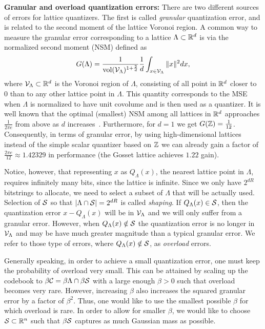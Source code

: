 \textbf{Granular and overload quantization errors:} There are two different sources of errors for lattice quantizers. The first is called \emph{granular} quantization error, and is related to the second moment of the lattice Voronoi region. A common way to measure the granular error corresponding to a lattice $\Lambda\subset\mathbb{R}^d$ is via the normalized second moment (NSM) defined as
\begin{align}
G(\Lambda)=\frac{1}{\mathrm{vol}(\mathcal{V}_{\Lambda})^{1+\frac{2}{d}}}\frac{1}{d}\int_{x\in \mathcal{V}_{\Lambda}}\|x\|^2dx,
\end{align}
where $\mathcal{V}_{\Lambda}\subset\mathbb{R}^d$ is the Voronoi region of $\Lambda$, consisting of all point in $\mathbb{R}^d$ closer to $0$ than to any other lattice point in $\Lambda$.
This quantity corresponds to the MSE when $\Lambda$ is normalized to have unit covolume and is then used as a quantizer. It is well known that the optimal (smallest) NSM among all lattices in $\mathbb{R}^d$ approaches $\frac{1}{2\pi e}$ from above as $d$ increases~\cite{ramiBook}. Furthermore, for $d=1$ we get $G(\mathbb{Z})=\frac{1}{12}$. Consequently, in terms of granular error, by using high-dimensional lattices instead of the simple scalar quantizer based on $\mathbb{Z}$ we can already gain a factor of $\frac{2\pi e}{12}\approx 1.42329$ in performance (the Gosset lattice achieves $1.22$ gain).

Notice, however, that representing $x$ as $Q_{\Lambda}(x)$, the nearest lattice point in $\Lambda$, requires infinitely many bits, since the lattice is infinite. Since we only have $2^{dR}$ bitstrings to allocate, we need to select a subset of $\Lambda$ that will be actually used. Selection of $\mathcal{S}$ so that $|\Lambda\cap \mathcal{S}|=2^{dR}$ is called \emph{shaping}. 
If $Q_{\Lambda}(x)\in\mathcal{S}$, then the quantization error $x-Q_{\Lambda}(x)$ will be in $\mathcal{V}_{\Lambda}$ and we will only suffer from a granular error. However, when $Q_{\Lambda}(x)\notin \mathcal{S}$ the quantization error is no longer in $\mathcal{V}_{\Lambda}$ and may be have much greater magnitude than a typical granular error. We refer to those type of errors, where $Q_{\Lambda}(x)\notin \mathcal{S}$, as \emph{overload} errors. 

Generally speaking, in order to achieve a small quantization error, one must keep the probability of overload very small. This can be attained by scaling up the codebook to $\beta\mathcal{C}=\beta\Lambda\cap \beta \mathcal{S}$ with a large enough $\beta>0$ such that overload becomes very rare. However, increasing $\beta$ also increases the squared granular error by a factor of $\beta^2$. Thus, one would like to use the smallest possible $\beta$ for which overload is rare. In order to allow for smaller $\beta$, we would like to choose $\mathcal{S}\subset\mathbb{R}^n$ such that $\beta\mathcal{S}$ captures as much Gaussian mass as possible.


